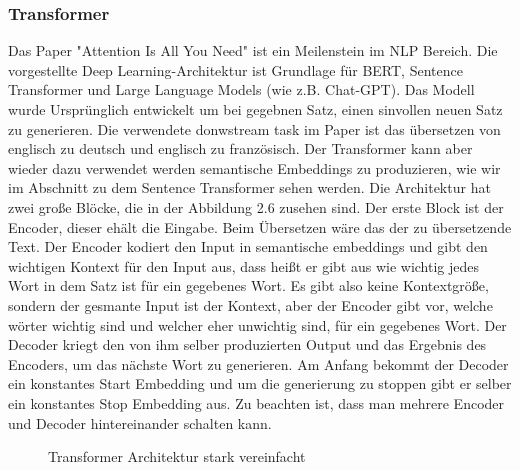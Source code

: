 \documentclass[12pt,letterpaper,ngerman]{article}
\begin{document}
\subsubsection{Transformer}
Das Paper "Attention Is All You Need" ist ein Meilenstein im NLP Bereich.
Die vorgestellte Deep Learning-Architektur ist Grundlage für
BERT, Sentence Transformer und Large Language Models (wie z.B. Chat-GPT).
Das Modell wurde Ursprünglich entwickelt um bei gegebnen Satz, einen
sinvollen neuen Satz zu generieren. Die verwendete donwstream task im
Paper ist das übersetzen von englisch zu deutsch und englisch zu französisch.
Der Transformer kann aber wieder dazu verwendet werden semantische 
Embeddings zu produzieren, wie wir im Abschnitt zu dem Sentence Transformer
sehen werden.
Die Architektur hat zwei große Blöcke, die in der Abbildung 2.6 zusehen
sind. Der erste Block ist der Encoder, dieser ehält die Eingabe. Beim
Übersetzen wäre das der zu übersetzende Text. Der Encoder kodiert den 
Input in semantische embeddings und gibt den wichtigen Kontext für den
Input aus, dass heißt er gibt aus wie wichtig jedes Wort in dem Satz ist
für ein gegebenes Wort. Es gibt also keine Kontextgröße, sondern der
gesmante Input ist der Kontext, aber der Encoder gibt vor, welche 
wörter wichtig sind und welcher eher unwichtig sind, für ein gegebenes
Wort. Der Decoder kriegt den von ihm selber produzierten Output und das
Ergebnis des Encoders, um das nächste Wort zu generieren. Am Anfang bekommt
der Decoder ein konstantes Start Embedding und um die generierung zu
stoppen gibt er selber ein konstantes Stop Embedding aus. Zu beachten
ist, dass man mehrere Encoder und Decoder hintereinander schalten 
kann.
\begin{figure}[H]
  \begin{center}
  \end{center}
  \caption{Transformer Architektur stark vereinfacht}
\end{figure}
\end{document}
